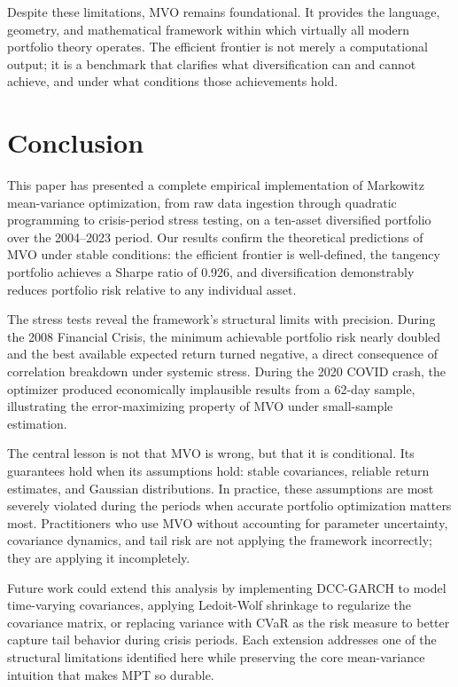 \documentclass[12pt]{article}
\begin{document}
Despite these limitations, MVO remains foundational. It provides the language,
geometry, and mathematical framework within which virtually all modern portfolio
theory operates. The efficient frontier is not merely a computational output;
it is a benchmark that clarifies what diversification can and cannot achieve,
and under what conditions those achievements hold.

\section{Conclusion}
\label{sec:conclusion}

This paper has presented a complete empirical implementation of Markowitz
mean-variance optimization, from raw data ingestion through quadratic
programming to crisis-period stress testing, on a ten-asset diversified
portfolio over the 2004--2023 period. Our results confirm the theoretical
predictions of MVO under stable conditions: the efficient frontier is
well-defined, the tangency portfolio achieves a Sharpe ratio of 0.926, and
diversification demonstrably reduces portfolio risk relative to any individual
asset.

The stress tests reveal the framework's structural limits with precision.
During the 2008 Financial Crisis, the minimum achievable portfolio risk nearly
doubled and the best available expected return turned negative, a direct
consequence of correlation breakdown under systemic stress. During the 2020
COVID crash, the optimizer produced economically implausible results from a
62-day sample, illustrating the error-maximizing property of MVO under
small-sample estimation.

The central lesson is not that MVO is wrong, but that it is conditional. Its
guarantees hold when its assumptions hold: stable covariances, reliable return
estimates, and Gaussian distributions. In practice, these assumptions are most
severely violated during the periods when accurate portfolio optimization
matters most. Practitioners who use MVO without accounting for parameter
uncertainty, covariance dynamics, and tail risk are not applying the framework
incorrectly; they are applying it incompletely.

Future work could extend this analysis by implementing DCC-GARCH to model
time-varying covariances, applying Ledoit-Wolf shrinkage to regularize the
covariance matrix, or replacing variance with CVaR as the risk measure to
better capture tail behavior during crisis periods. Each extension addresses
one of the structural limitations identified here while preserving the core
mean-variance intuition that makes MPT so durable.
\end{document}
